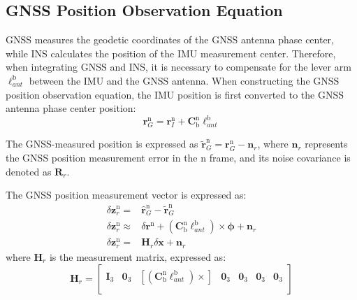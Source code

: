 \documentclass{article}
\begin{document}
\subsection{GNSS Position Observation Equation}\label{subsec:gnss-position-observation-equation}

GNSS measures the geodetic coordinates of the GNSS antenna phase center, while INS calculates the position of the IMU measurement center. Therefore, when integrating GNSS and INS, it is necessary to compensate for the lever arm $\boldsymbol{\ell}_{ant}^{\mathrm{b}}$ between the IMU and the GNSS antenna. When constructing the GNSS position observation equation, the IMU position is first converted to the GNSS antenna phase center position:
\begin{equation}
    \label{eq:gnss-antenna-position-from-imu-position}
    {\boldsymbol{r}}_{G}^{\mathrm{n}} = {\boldsymbol{r}}_{I}^{\mathrm{n}} + {\mathbf{C}}_{\mathrm{b}}^{\mathrm{n}}\boldsymbol{\ell}_{ant}^{\mathrm{b}}
\end{equation}

The GNSS-measured position is expressed as $\tilde{\boldsymbol{r}}_{G}^{\mathrm{n}} = {\boldsymbol{r}}_{G}^{\mathrm{n}} - \boldsymbol{n}_{r}$, where $\boldsymbol{n}_{r}$ represents the GNSS position measurement error in the $\mathrm{n}$ frame, and its noise covariance is denoted as $\boldsymbol{R}_{r}$.

The GNSS position measurement vector is expressed as:
\begin{equation}
    \begin{aligned}
        \delta \boldsymbol{z}_{r}^{\mathrm{n}} =& \hat{\boldsymbol{r}}_{G}^{\mathrm{n}}-\tilde{\boldsymbol{r}}_{G}^{\mathrm{n}} \\
        \delta \boldsymbol{z}_{r}^{\mathrm{n}} \approx& \delta \boldsymbol{r}^{\mathrm{n}}+(\mathbf{C}_{\mathrm{b}}^{\mathrm{n}} \boldsymbol{\ell}_{ant}^{\mathrm{b}})\times \boldsymbol{\phi }+\boldsymbol{n}_{r} \\
        \delta \boldsymbol{z}_{r}^{\mathrm{n}} =& \boldsymbol{H}_{r} \delta \boldsymbol{x} + \boldsymbol{n}_{r}
    \end{aligned}
\end{equation}
where $\boldsymbol{H}_{r}$ is the measurement matrix, expressed as:
\begin{equation}
    {\boldsymbol{H}_{r}}=\left[ \begin{matrix}
        \boldsymbol{I}_3&		\boldsymbol{0}_3&		[(\mathbf{C}_{\mathrm{b}}^{\mathrm{n}}\boldsymbol{\ell }_{ant}^{\mathrm{b}})\times ]&		\boldsymbol{0}_3&		\boldsymbol{0}_3&		\boldsymbol{0}_3&		\boldsymbol{0}_3\\
    \end{matrix} \right] 
\end{equation}
\end{document}

